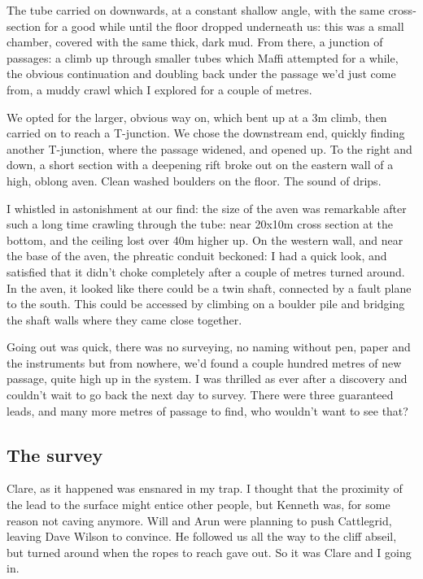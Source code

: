 The tube carried on downwards, at a constant shallow angle, with the same cross-section for a good while until the floor dropped underneath us: this was a small chamber, covered with the same thick, dark mud. From there, a junction of passages: a climb up through smaller tubes which Maffi attempted for a while, the obvious continuation and doubling back under the passage we'd just come from, a muddy crawl which I explored for a couple of metres. 

We opted for the larger, obvious way on, which bent up at a 3m climb, then carried on to reach a T-junction. We chose the downstream end, quickly finding another T-junction, where the passage widened, and opened up. To the right and down, a short section with a deepening rift broke out on the eastern wall of a high, oblong aven. Clean washed boulders on the floor. The sound of drips. 

I whistled in astonishment at our find: the size of the aven was remarkable after such a long time crawling through the tube: near 20x10m cross section at the bottom, and the ceiling lost over 40m higher up. On the western wall, and near the base of the aven, the phreatic conduit beckoned: I had a quick look, and satisfied that it didn't choke completely after a couple of metres turned around. In the aven, it looked like there could be a twin shaft, connected by a fault plane to the south. This could be accessed by climbing on a boulder pile and bridging the shaft walls where they came close together.

Going out was quick, there was no surveying, no naming without pen, paper and the instruments but from nowhere, we'd found a couple hundred metres of new passage, quite high up in the system. I was thrilled as ever after a discovery and couldn't wait to go back the next day to survey. There were three guaranteed leads, and many more metres of passage to find, who wouldn't want to see that?

\subsection{The survey}
Clare, as it happened was ensnared in my trap. I thought that the proximity of the lead to the surface might entice other people, but Kenneth was, for some reason not caving anymore. Will and Arun were planning to push Cattlegrid, leaving Dave Wilson to convince. He followed us all the way to the cliff abseil, but turned around when the ropes to reach  gave out. So it was Clare and I going in. 

